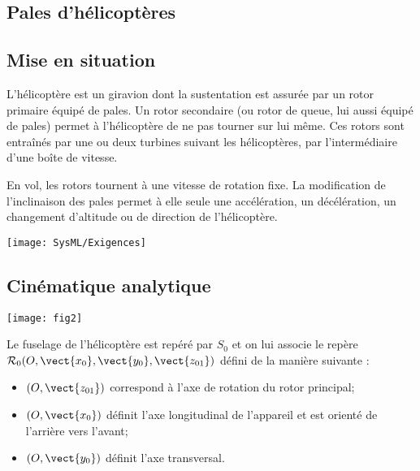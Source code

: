 \ifprof
\else
\begin{multicols}{2}
\fi




\section*{Pales d'hélicoptères}
\subsection*{Mise en situation}
\ifprof
\else
L'hélicoptère est un giravion dont la sustentation est assurée par un rotor primaire équipé de pales. Un rotor secondaire (ou rotor de queue, lui aussi équipé de pales) permet à l'hélicoptère de ne pas tourner sur lui même. Ces rotors sont entraînés par une ou deux turbines suivant les hélicoptères, par l'intermédiaire d'une boîte de vitesse. 

En vol, les rotors tournent à une vitesse de rotation fixe. La modification de l'inclinaison des pales permet à elle seule une accélération, un décélération, un changement d'altitude ou de direction de l'hélicoptère.



\begin{center}
\texttt{[image: SysML/Exigences]}
\end{center}
\fi
\subsection*{Cinématique analytique}
\ifprof
\else
\begin{center}
\texttt{[image: fig2]}
\end{center}

Le fuselage de l'hélicoptère est repéré par $S_0$ et on lui associe le repère $\mathcal{R}_0(O,\vect{x_0},\vect{y_0},\vect{z_{01}})$ défini de la
manière suivante :
\begin{itemize}
\item $(O,\vect{z_{01}})$ correspond à l'axe de rotation du rotor principal;
\item $(O, \vect{x_0} )$ définit l'axe longitudinal de l'appareil et est orienté de l'arrière vers l'avant;
\item $(O, \vect{y_0} )$ définit l'axe transversal.
\end{itemize}


\end{multicols}
